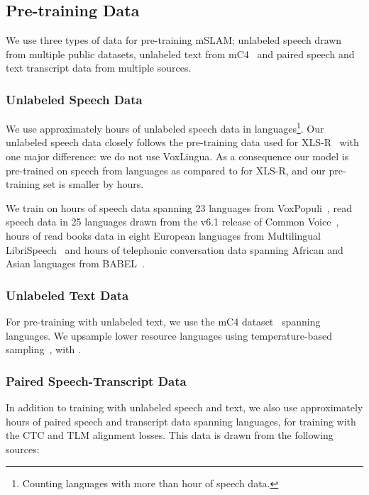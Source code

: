 \documentclass[nohyperref]{article}
\newcommand{\xlsrp}{XLS-R}
\newcommand{\mslam}{mSLAM}
\begin{document}
\subsection{Pre-training Data}
\label{subsec:pretrain-data}

We use three types of data for pre-training \mslam{}; unlabeled speech drawn from multiple public datasets, unlabeled text from mC4~\citep{Xue2021mT5AM} and paired speech and text transcript data from multiple sources.


\subsubsection{Unlabeled Speech Data}
\label{subsubsec:pretrain-data-speech}
We use approximately  hours of unlabeled speech data in  languages\footnote{Counting languages with more than  hour of speech data.}. Our unlabeled speech data closely follows the pre-training data used for \xlsrp~\citep{babu2021xls} with one major difference: we do not use VoxLingua. As a consequence our model is pre-trained on speech from  languages as compared to  for \xlsrp, and our pre-training set is smaller by  hours.

We train on  hours of speech data spanning 23 languages from VoxPopuli~\citep{wang2021voxpopuli}, read speech data in 25 languages drawn from the v6.1 release of Common Voice~\citep{ardila2019common},  hours of read books data in eight European languages from Multilingual LibriSpeech~\citep{pratap2020mls} and  hours of telephonic conversation data spanning  African and Asian languages from BABEL~\citep{Gales2014SpeechRA}.

\subsubsection{Unlabeled Text Data}
\label{subsubsec:pretrain-data-text}
For pre-training with unlabeled text, we use the mC4 dataset~\citep{xue-etal-2021-mt5} spanning  languages. We upsample lower resource languages using temperature-based sampling~\citep{arivazhagan2019massively}, with .

\subsubsection{Paired Speech-Transcript Data}
\label{subsubsec:pretrain-data-paired}
In addition to training with unlabeled speech and text, we also use approximately  hours of paired speech and transcript data spanning  languages, for training with the CTC and TLM alignment losses. This data is drawn from the following sources:
\end{document}
